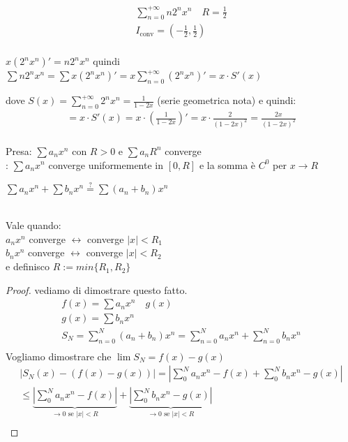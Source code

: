 \documentclass[a4paper, oneside]{article}
\begin{document}
\begin{example}
  \begin{gather*}
    \sum_{n=0}^{+\infty} n 2^n x^n \quad R = \frac{1}{2} \\
    I_\text{conv} = (-\frac{1}{2}, \frac{1}{2}) \\
  \end{gather*}
  \begin{observation}
    $x(2^n x^n)' = n 2^n x^n$ quindi $\sum n 2^n x^n = \sum x (2^n x^n)' = \boxed{x \sum_{n=0}^{+\infty} (2^n x^n)'} = x \cdot S'(x)$
  \end{observation}
  dove $S(x) = \sum_{n=0}^{+\infty} 2^n x^n = \frac{1}{1-2x}$ (serie geometrica nota) e quindi:
  \begin{gather*}
    = x \cdot S'(x) = x \cdot \left(\frac{1}{1-2x}\right)' = x \cdot \frac{2}{(1-2x)^2} = \frac{2x}{(1-2x)^2} \\
  \end{gather*}
\end{example}
\begin{theorem}
  [di Abel]
  Presa: $\sum a_n x^n$ con $ R>0 $ e $\sum a_n R^n$ converge\\
  : $\sum a_n x^n $ converge uniformemente in $[0,R]$ e la somma è $C^0$ per $x \to R$
\end{theorem}
\begin{problem}
  $\sum a_n x^n + \sum b_n x^n \overset{?}{=} \sum (a_n + b_n) x^n$ 
\end{problem}
\begin{solution}
  \hfil\\
  Vale quando:\\
  $a_n x^n $ converge $\leftrightarrow$ converge $|x|<R_1$\\
  $b_n x^n $ converge $\leftrightarrow$ converge $|x|<R_2$\\
  e definisco $R := min \{ R_1, R_2 \}$
\end{solution}
\begin{proof}
  vediamo di dimostrare questo fatto.\\
  \begin{gather*}
    f(x) = \sum a_n x^n \quad g(x)\\
    g(x) = \sum b_n x^n \\
    S_N = \sum_{n=0}^{N} (a_n + b_n) x^n = \sum_{n=0}^{N} a_n x^n + \sum_{n=0}^{N} b_n x^n \\
  \end{gather*}
  Vogliamo dimostrare che $\lim S_N = f(x) - g(x)$
  \begin{gather*}
    \left\lvert S_N(x) - (f(x)- g(x)) \right\rvert = \left\lvert \sum_{0}^{N} a_n x^n - f(x) + \sum_{0}^{N} b_n x^n - g(x) \right\rvert \\
    \leq \underbrace{\left\lvert \sum_{0}^{N} a_n x^n - f(x) \right\rvert}_{\to 0 \text{ se } |x| < R} + \underbrace{\left\lvert \sum_{0}^{N} b_n x^n - g(x) \right\rvert}_{\to 0 \text{ se } |x| < R} \\
  \end{gather*}
\end{proof}
\end{document}

